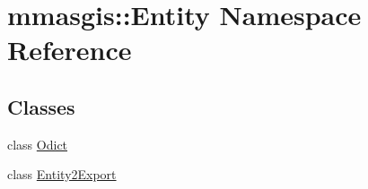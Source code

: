 \hypertarget{namespacemmasgis_1_1Entity}{
\section{mmasgis::Entity Namespace Reference}
\label{namespacemmasgis_1_1Entity}
}
\subsection*{Classes}
\begin{DoxyCompactItemize}
\item 
class \hyperlink{classmmasgis_1_1Entity_1_1Odict}{Odict}
\item 
class \hyperlink{classmmasgis_1_1Entity_1_1Entity2Export}{Entity2Export}
\end{DoxyCompactItemize}
